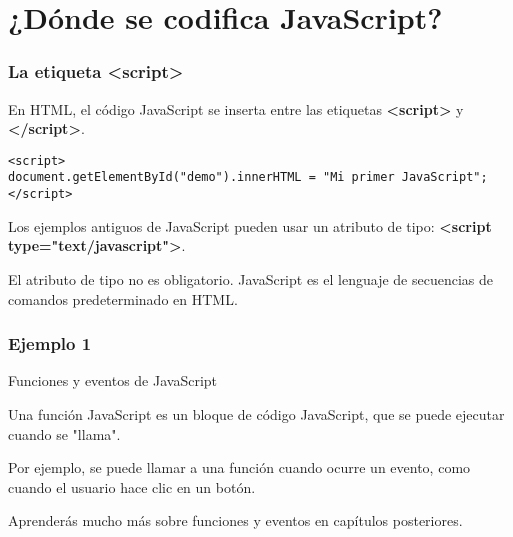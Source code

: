 
\section{¿Dónde se codifica JavaScript?}

\begin{frame}[fragile]
  \frametitle{La etiqueta <script>}

  En HTML, el código JavaScript se inserta entre las etiquetas
  \textbf{<script>} y \textbf{</script>}.

  \vspace{\baselineskip}
  \begin{lstlisting}
<script>
document.getElementById("demo").innerHTML = "Mi primer JavaScript";
</script>
  \end{lstlisting}

  \begin{block}{}
    Los ejemplos antiguos de JavaScript pueden usar un atributo de tipo:
    \textbf{<script type="text/javascript">}.

    \vspace{\baselineskip}
    El atributo de tipo no es obligatorio. JavaScript es el lenguaje de
    secuencias de comandos predeterminado en HTML.
  \end{block}
\end{frame}

\begin{frame}[fragile]
  \frametitle{Ejemplo 1}
  
\end{frame}

\begin{frame}[c]{Funciones y eventos de JavaScript}

  Una función JavaScript es un bloque de código JavaScript,
  que se puede ejecutar cuando se "llama".

  \vspace{\baselineskip}
  Por ejemplo, se puede llamar a una función cuando ocurre un evento,
  como cuando el usuario hace clic en un botón.

  \vspace{\baselineskip}
  \begin{exampleblock}{}
    Aprenderás mucho más sobre funciones y eventos en
    capítulos posteriores.
  \end{exampleblock}
\end{frame}

